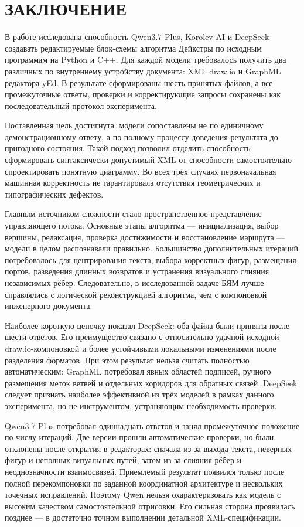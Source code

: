 \documentclass[a4paper,12pt]{extreport}
\begin{document}
\chapter*{ЗАКЛЮЧЕНИЕ}

В работе исследована способность Qwen3.7-Plus, Korolev AI и DeepSeek создавать редактируемые блок-схемы алгоритма Дейкстры по исходным программам на Python и C++. Для каждой модели требовалось получить два различных по внутреннему устройству документа: XML draw.io и GraphML редактора yEd. В результате сформированы шесть принятых файлов, а все промежуточные ответы, проверки и корректирующие запросы сохранены как последовательный протокол эксперимента.

Поставленная цель достигнута: модели сопоставлены не по единичному демонстрационному ответу, а по полному процессу доведения результата до пригодного состояния. Такой подход позволил отделить способность сформировать синтаксически допустимый XML от способности самостоятельно спроектировать понятную диаграмму. Во всех трёх случаях первоначальная машинная корректность не гарантировала отсутствия геометрических и типографических дефектов.

Главным источником сложности стало пространственное представление управляющего потока. Основные этапы алгоритма --- инициализация, выбор вершины, релаксация, проверка достижимости и восстановление маршрута --- модели в целом распознавали правильно. Большинство дополнительных итераций потребовалось для центрирования текста, выбора корректных фигур, размещения портов, разведения длинных возвратов и устранения визуального слияния независимых рёбер. Следовательно, в исследованной задаче БЯМ лучше справлялись с логической реконструкцией алгоритма, чем с компоновкой инженерного документа.

Наиболее короткую цепочку показал DeepSeek: оба файла были приняты после шести ответов. Его преимущество связано с относительно удачной исходной draw.io-компоновкой и более устойчивыми локальными изменениями после разделения форматов. При этом результат нельзя считать полностью автоматическим: GraphML потребовал явных областей подписей, ручного размещения меток ветвей и отдельных коридоров для обратных связей. DeepSeek следует признать наиболее эффективной из трёх моделей в рамках данного эксперимента, но не инструментом, устраняющим необходимость проверки.

Qwen3.7-Plus потребовал одиннадцать ответов и занял промежуточное положение по числу итераций. Две версии прошли автоматические проверки, но были отклонены после открытия в редакторах: сначала из-за выхода текста, неверных фигур и неполных визуальных путей, затем из-за слияния рёбер и неоднозначности взаимосвязей. Приемлемый результат появился только после полной перекомпоновки по заданной координатной архитектуре и нескольких точечных исправлений. Поэтому Qwen нельзя охарактеризовать как модель с высоким качеством самостоятельной отрисовки. Его сильная сторона проявилась позднее --- в достаточно точном выполнении детальной XML-спецификации.
\end{document}
